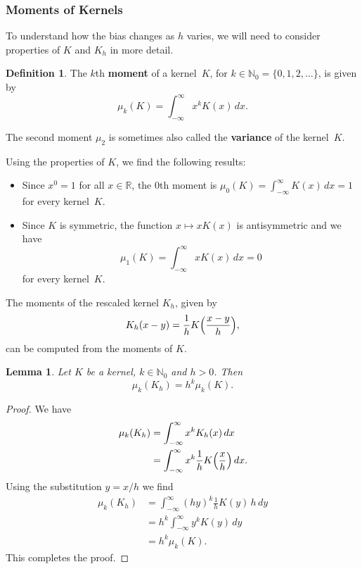 \documentclass[
  a4paper,
]{article}
\newtheorem{lemma}{Lemma}[section]
\theoremstyle{definition}
\newtheorem{definition}{Definition}[section]
\theoremstyle{definition}
\theoremstyle{definition}
\theoremstyle{definition}
\theoremstyle{remark}
\begin{document}
\subsubsection{Moments of Kernels}\label{moments-of-kernels}

To understand how the bias changes as \(h\) varies, we will need to
consider properties of \(K\) and \(K_h\) in more detail.

\begin{definition}
The \(k\)th \textbf{moment} of a kernel~\(K\),
for \(k \in \mathbb{N}_0 = \{0, 1, 2, \ldots\}\), is given by
\begin{equation*}
  \mu_k(K)
  = \int_{-\infty}^\infty x^k K(x) \,dx.
\end{equation*}
\end{definition}

The second moment \(\mu_2\) is sometimes also called the \textbf{variance}
of the kernel~\(K\).

Using the properties of \(K\), we find the following results:

\begin{itemize}
\item
  Since \(x^0 = 1\) for all \(x\in\mathbb{R}\),
  the \(0\)th moment is \(\mu_0(K) = \int_{-\infty}^\infty K(x) \,dx = 1\)
  for every kernel~\(K\).
\item
  Since \(K\) is symmetric, the function \(x \mapsto x K(x)\) is
  antisymmetric and we have
  \begin{equation*}
    \mu_1(K)
    = \int_{-\infty}^\infty x K(x) \,dx
    = 0
  \end{equation*}
  for every kernel~\(K\).
\end{itemize}

The moments of the rescaled kernel \(K_h\), given by
\begin{equation*}
    K_h(x - y)
    = \frac{1}{h} K\Bigl( \frac{x-y}{h} \Bigr),
\end{equation*}
can be computed from the moments of \(K\).

\begin{lemma}
\protect\hypertarget{lem:Kh-scal}{}\label{lem:Kh-scal}Let \(K\) be a kernel, \(k \in \mathbb{N}_0\) and \(h > 0\). Then
\begin{equation*}
  \mu_k(K_h)
  = h^k \mu_k(K).
\end{equation*}
\end{lemma}

\begin{proof}
We have
\begin{align*}
  \mu_k(K_h)
  &= \int_{-\infty}^\infty x^k K_h(x) \,dx \\
  &= \int_{-\infty}^\infty x^k \frac1h K\Bigl(\frac{x}{h}\Bigr) \,dx.
\end{align*}
Using the substitution \(y = x/h\) we find
\begin{align*}
  \mu_k(K_h)
  &= \int_{-\infty}^\infty (hy)^k \frac1h K(y) \, h \,dy \\
  &= h^k \int_{-\infty}^\infty y^k K(y) \,dy \\
  &= h^k \mu_k(K).
\end{align*}
This completes the proof.
\end{proof}
\end{document}

